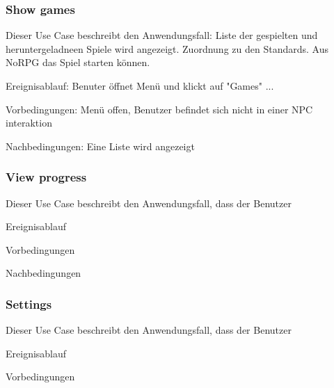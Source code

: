 		\subsubsection{Show games}
			Dieser Use Case beschreibt den Anwendungsfall: Liste der gespielten und heruntergeladneen Spiele wird angezeigt. Zuordnung zu den Standards. Aus NoRPG das Spiel starten können.
			
			Ereignisablauf: Benuter öffnet Menü und klickt auf "Games" ...

			Vorbedingungen: Menü offen, Benutzer befindet sich nicht in einer NPC interaktion
			
			Nachbedingungen: Eine Liste wird angezeigt
	
		\subsubsection{View progress}
			Dieser Use Case beschreibt den Anwendungsfall, dass der Benutzer 
			
			Ereignisablauf
	
			Vorbedingungen
			
			Nachbedingungen
	
		\subsubsection{Settings}
			Dieser Use Case beschreibt den Anwendungsfall, dass der Benutzer 
			
			Ereignisablauf
	
			Vorbedingungen
			
